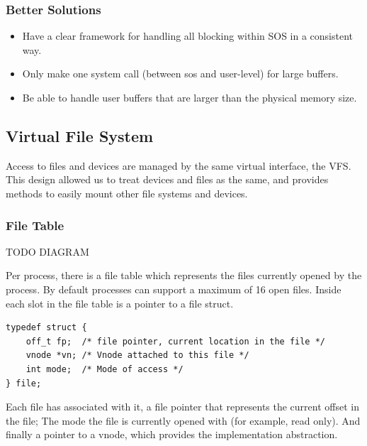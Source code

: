 \documentclass[runningheads,a4paper]{llncs}
\begin{document}
\subsubsection{Better Solutions}

\begin{itemize}[label={\checkmark}]
  \item Have a clear framework for handling all blocking within SOS in a consistent way.
  \item Only make one system call (between sos and user-level) for large buffers.
  \item Be able to handle user buffers that are larger than the physical memory size.
\end{itemize}


\medskip
\medskip

\subsection{Virtual File System}

Access to files and devices are managed by the same virtual interface, the VFS. This design allowed us to treat devices and files as the same, and provides methods to easily mount other file systems and devices.

\subsubsection{File Table}



TODO DIAGRAM

Per process, there is a file table which represents the files currently opened by the process. By default processes can support a maximum of 16 open files. Inside each slot in the file table is a pointer to a file struct.

\begin{lstlisting}[style=CStyle]
typedef struct {
    off_t fp;  /* file pointer, current location in the file */
    vnode *vn; /* Vnode attached to this file */
    int mode;  /* Mode of access */
} file;
\end{lstlisting}

Each file has associated with it, a file pointer that represents the current offset in the file; The mode the file is currently opened with (for example, read only). And finally a pointer to a vnode, which provides the implementation abstraction.
\end{document}

